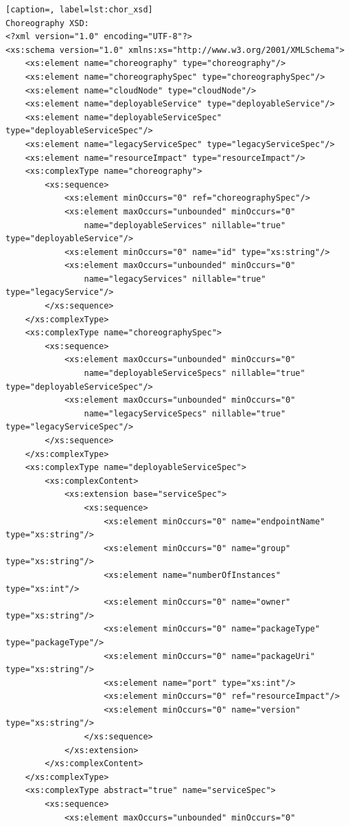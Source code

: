 \documentclass[a4paper, 10pt]{article}
\begin{document}
{\begin{lstlisting}[caption=, label=lst:chor_xsd]
Choreography XSD:
<?xml version="1.0" encoding="UTF-8"?>
<xs:schema version="1.0" xmlns:xs="http://www.w3.org/2001/XMLSchema">
    <xs:element name="choreography" type="choreography"/>
    <xs:element name="choreographySpec" type="choreographySpec"/>
    <xs:element name="cloudNode" type="cloudNode"/>
    <xs:element name="deployableService" type="deployableService"/>
    <xs:element name="deployableServiceSpec" type="deployableServiceSpec"/>
    <xs:element name="legacyServiceSpec" type="legacyServiceSpec"/>
    <xs:element name="resourceImpact" type="resourceImpact"/>
    <xs:complexType name="choreography">
        <xs:sequence>
            <xs:element minOccurs="0" ref="choreographySpec"/>
            <xs:element maxOccurs="unbounded" minOccurs="0"
                name="deployableServices" nillable="true" type="deployableService"/>
            <xs:element minOccurs="0" name="id" type="xs:string"/>
            <xs:element maxOccurs="unbounded" minOccurs="0"
                name="legacyServices" nillable="true" type="legacyService"/>
        </xs:sequence>
    </xs:complexType>
    <xs:complexType name="choreographySpec">
        <xs:sequence>
            <xs:element maxOccurs="unbounded" minOccurs="0"
                name="deployableServiceSpecs" nillable="true" type="deployableServiceSpec"/>
            <xs:element maxOccurs="unbounded" minOccurs="0"
                name="legacyServiceSpecs" nillable="true" type="legacyServiceSpec"/>
        </xs:sequence>
    </xs:complexType>
    <xs:complexType name="deployableServiceSpec">
        <xs:complexContent>
            <xs:extension base="serviceSpec">
                <xs:sequence>
                    <xs:element minOccurs="0" name="endpointName" type="xs:string"/>
                    <xs:element minOccurs="0" name="group" type="xs:string"/>
                    <xs:element name="numberOfInstances" type="xs:int"/>
                    <xs:element minOccurs="0" name="owner" type="xs:string"/>
                    <xs:element minOccurs="0" name="packageType" type="packageType"/>
                    <xs:element minOccurs="0" name="packageUri" type="xs:string"/>
                    <xs:element name="port" type="xs:int"/>
                    <xs:element minOccurs="0" ref="resourceImpact"/>
                    <xs:element minOccurs="0" name="version" type="xs:string"/>
                </xs:sequence>
            </xs:extension>
        </xs:complexContent>
    </xs:complexType>
    <xs:complexType abstract="true" name="serviceSpec">
        <xs:sequence>
            <xs:element maxOccurs="unbounded" minOccurs="0"

\end{lstlisting}}
\end{document}
